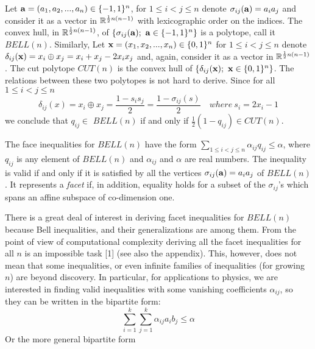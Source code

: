 Let ${\bf a}=(a_{1},a_{2},...,a_{n})\in \{-1,1\}^{n}$, for $1\leq i<j\leq n$
denote $\sigma _{ij}({\bf a})=a_{i}a_{j}$ and consider it as a vector in $%
{\Bbb R}^{\frac{1}{2}n(n-1)}$ with lexicographic order on the indices. The
convex hull, in ${\Bbb R}^{\frac{1}{2}n(n-1)}$, of $\{\sigma _{ij}({\bf a}%
);\ {\bf a}\in \{-1,1\}^{n}\}$ is a polytope, call it $BELL(n)$. Similarly,
Let ${\bf x}=(x_{1},x_{2},...,x_{n})\in \{0,1\}^{n}$ for $1\leq i<j\leq n$
denote $\delta _{ij}({\bf x})=x_{i}\oplus x_{j}=x_{i}+x_{j}-2x_{i}x_{j}$
and, again, consider it as a vector in ${\Bbb R}^{\frac{1}{2}n(n-1)}$. The
cut polytope $CUT(n)$ is the convex hull of $\{\delta _{ij}({\bf x});\ {\bf x%
}\in \{0,1\}^{n}\}$. The relations between these two polytopes is not hard
to derive. Since for all $1\leq i<j\leq n$
\begin{equation}
\delta _{ij}(x)=x_{i}\oplus x_{j}=\frac{1-s_{i}s_{j}}{2}=\frac{1-\sigma
_{ij}(s)}{2}\quad where\ s_{i}=2x_{i}-1
\end{equation}
we conclude that $q_{ij}\in $ $BELL(n)$ if and only if $%
{\frac12}%
(1-q_{ij})\in CUT(n)$.

The face inequalities for $BELL(n)$ have the form $\sum_{1\leq i<j\leq
n}\alpha _{ij}q_{ij}\leq \alpha $, where $q_{ij}$ is any element of $BELL(n)$
and $\alpha _{ij}$ and $\alpha $ are real numbers. The inequality is valid
if and only if it is satisfied by all the vertices $\sigma _{ij}({\bf a}%
)=a_{i}a_{j}$ of $BELL(n)$. It represents a {\em facet} if, in addition,
equality holds for a subset of the $\sigma _{ij}$'s which spans an affine
subspace of co-dimension one.

There is a great deal of interest in deriving facet inequalities for $BELL(n)
$ because Bell inequalities, and their generalizations are among them. From
the point of view of computational complexity deriving all the facet
inequalities for all $n$ is an impossible task [1] (see also the appendix).
This, however, does not mean that some inequalities, or even infinite
families of inequalities (for growing $n$) are beyond discovery. In
particular, for applications to physics, we are interested in finding valid
inequalities with some vanishing coefficients $\alpha _{ij}$, so they can be
written in the bipartite form:
\begin{equation}
\sum_{i=1}^{k}\sum_{j=1}^{k}\alpha _{ij}a_{i}b_{j}\leq \alpha
\end{equation}
Or the more general bipartite form

